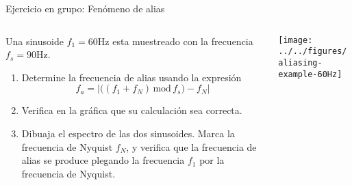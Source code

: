\documentclass[presentation,aspectratio=169]{beamer}
\begin{document}
\begin{frame}[label={sec:orgc52d598}]{Ejercicio en grupo: Fenómeno de alias}
\begin{columns}
\begin{column}{0.4\columnwidth}
Una sinusoide \(f_1=60\)Hz esta muestreado con la frecuencia \(f_s=90\)Hz.

\begin{enumerate}
\item Determine la frecuencia de alias usando la expresión
\[ f_a = \left| \big( (f_1 + f_N) \, \text{mod}\, f_s\big) - f_N\right|\]
\item Verifica en la gráfica que su calculación sea correcta.
\item Dibuaja el espectro de las dos sinusoides. Marca la frecuencia de Nyquist \(f_N\), y verifica que la frecuencia de alias se produce plegando la frecuencia \(f_1\) por la frecuencia de Nyquist.
\end{enumerate}
\end{column}

\begin{column}{0.6\columnwidth}
\texttt{[image: ../../figures/aliasing-example-60Hz]}
\end{column}
\end{columns}
\end{frame}
\end{document}
